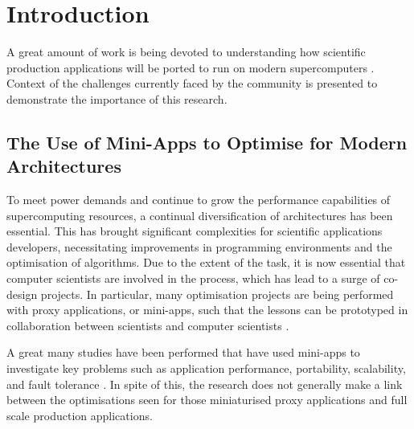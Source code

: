 \documentclass[runningheads,a4paper]{llncs}
\begin{document}
\section{Introduction}

A great amount of work is being devoted to understanding how scientific production applications will be ported to run on modern supercomputers \cite{}. Context of the challenges currently faced by the community is presented to demonstrate the importance of this research. 

\subsection{The Use of Mini-Apps to Optimise for Modern Architectures}

To meet power demands and continue to grow the performance capabilities of supercomputing resources, a continual diversification of architectures has been essential. This has brought significant complexities for scientific applications developers, necessitating improvements in programming environments and the optimisation of algorithms. Due to the extent of the task, it is now essential that computer scientists are involved in the process, which has lead to a surge of co-design projects. In particular, many optimisation projects are being performed with proxy applications, or mini-apps, such that the lessons can be prototyped in collaboration between scientists and computer scientists \cite{Mantevo}.

A great many studies have been performed that have used mini-apps to investigate key problems such as application performance, portability, scalability, and fault tolerance \cite{Hart2015} \cite{Bercea2015} \cite{Martineau2016}. In spite of this, the research does not generally make a link between the optimisations seen for those miniaturised proxy applications and full scale production applications.

\end{document}
